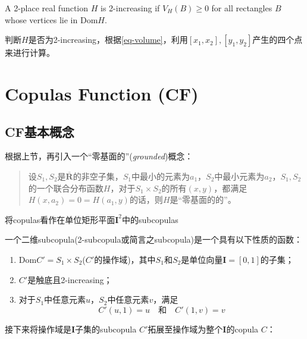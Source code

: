 \begin{definition}
    A 2-place real function $H$ is 2-increasing if $V_H(B) \geq 0$ for all rectangles $B$ whose vertices lie in Dom$H$.
    \label{def2.1.2}
\end{definition}

判断$H$是否为2-increasing，根据\cref{eq-volume}，利用$[x_1,x_2],[y_1,y_2]$产生的四个点来进行计算。


\section{Copulas Function (CF)}
\subsection{CF基本概念}\cite{Bill2000An}
根据上节，再引入一个``零基面的''(\emph{\textcolor[rgb]{1,0,0}{grounded}})概念：
\begin{quotation}
    设$S_1,S_2$是$\bar{\mathbf{R}}$的非空子集，$S_1$中最小的元素为$a_1$，$S_2$中最小元素为$a_2$，$S_1,S_2$的一个联合分布函数$H$，对于$S_1 \times S_2$的所有$(x,y)$，都满足$H(x,a_2)=0=H(a_1,y)$的话，则$H$是``零基面的的''。
\end{quotation}

将copulas看作在单位矩形平面$\mathbf{I}^2$中的subcopulas
\begin{definition}
    一个二维subcopula(2-subcopula或简言之subcopula)是一个具有以下性质的函数：
    \begin{enumerate}[1.]
        \item Dom$C' = S_1 \times S_2$($C'$的操作域)，其中$S_1$和$S_2$是单位向量$\mathbf{I}=[0,1]$的子集；
        \item $C'$是触底且2-increasing；
        \item 对于$S_1$中任意元素$u$，$S_2$中任意元素$v$，满足
            \begin{equation}
                C'(u,1) = u \quad \text{和} \quad C'(1,v) = v
                \label{eq-subcopula}
            \end{equation}
    \end{enumerate}
    \label{def2.2.1}
\end{definition}


接下来将操作域是$\mathbf{I}$子集的subcopula $C'$拓展至操作域为整个$\mathbf{I}$的copula $C$：


